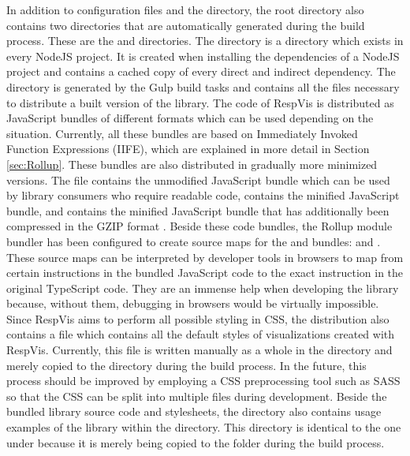 In addition to configuration files and the  directory, the root directory also contains two directories that are automatically generated during the build process.
These are the  and  directories.
The  directory is a directory which exists in every NodeJS project.
It is created when installing the dependencies of a NodeJS project and contains a cached copy of every direct and indirect dependency.
The  directory is generated by the Gulp build tasks and contains all the files necessary to distribute a built version of the library.
The code of RespVis is distributed as JavaScript bundles of different formats which can be used depending on the situation.
Currently, all these bundles are based on Immediately Invoked Function Expressions (IIFE), which are explained in more detail in Section \ref{sec:Rollup}.
These bundles are also distributed in gradually more minimized versions.
The  file contains the unmodified JavaScript bundle which can be used by library consumers who require readable code,  contains the minified JavaScript bundle, and  contains the minified JavaScript bundle that has additionally been compressed in the GZIP format \parencite{GZIP}.
Beside these code bundles, the Rollup module bundler has been configured to create source maps for the  and  bundles:  and .
These source maps can be interpreted by developer tools in browsers to map from certain instructions in the bundled JavaScript code to the exact instruction in the original TypeScript code.
They are an immense help when developing the library because, without them, debugging in browsers would be virtually impossible.
Since RespVis aims to perform all possible styling in CSS, the distribution also contains a  file which contains all the default styles of visualizations created with RespVis. 
Currently, this file is written manually as a whole in the  directory and merely copied to the  directory during the build process.
In the future, this process should be improved by employing a CSS preprocessing tool such as SASS \parencite{SASS} so that the CSS can be split into multiple files during development.
Beside the bundled library source code and stylesheets, the  directory also contains usage examples of the library within the  directory.
This directory is identical to the one under  because it is merely being copied to the  folder during the build process.


